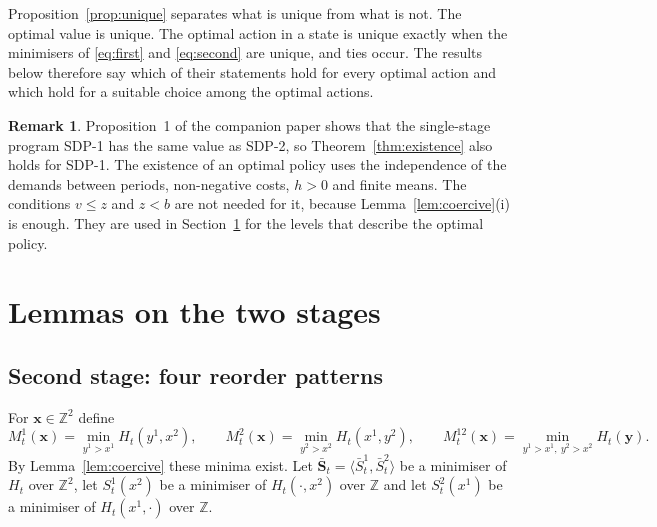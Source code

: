 \documentclass[11pt]{article}
\renewcommand{\vec}[1]{\boldsymbol{#1}}
\newcommand{\Z}{\mathbb{Z}}
\theoremstyle{definition}
\newtheorem{remark}{Remark}
\begin{document}
Proposition~\ref{prop:unique} separates what is unique from what is not. The optimal value is unique. The optimal action in a state is unique exactly when the minimisers of \eqref{eq:first} and \eqref{eq:second} are unique, and ties occur. The results below therefore say which of their statements hold for every optimal action and which hold for a suitable choice among the optimal actions.

\begin{remark}
Proposition~1 of the companion paper shows that the single-stage program SDP-1 has the same value as SDP-2, so Theorem~\ref{thm:existence} also holds for SDP-1. The existence of an optimal policy uses the independence of the demands between periods, non-negative costs, $h>0$ and finite means. The conditions $v\le z$ and $z<b$ are not needed for it, because Lemma~\ref{lem:coercive}(i) is enough. They are used in Section~\ref{sec:lemmas} for the levels that describe the optimal policy.
\end{remark}

\section{Lemmas on the two stages}\label{sec:lemmas}

\subsection{Second stage: four reorder patterns}

For $\vec{x}\in\Z^2$ define
\[
M^1_t(\vec{x})=\min_{y^1>x^1}H_t(y^1,x^2),\qquad M^2_t(\vec{x})=\min_{y^2>x^2}H_t(x^1,y^2),\qquad M^{12}_t(\vec{x})=\min_{y^1>x^1,\ y^2>x^2}H_t(\vec{y}).
\]
By Lemma~\ref{lem:coercive} these minima exist. Let $\bar{\vec{S}}_t=\langle\bar S^1_t,\bar S^2_t\rangle$ be a minimiser of $H_t$ over $\Z^2$, let $S^1_t(x^2)$ be a minimiser of $H_t(\cdot,x^2)$ over $\Z$ and let $S^2_t(x^1)$ be a minimiser of $H_t(x^1,\cdot)$ over $\Z$.
\end{document}
